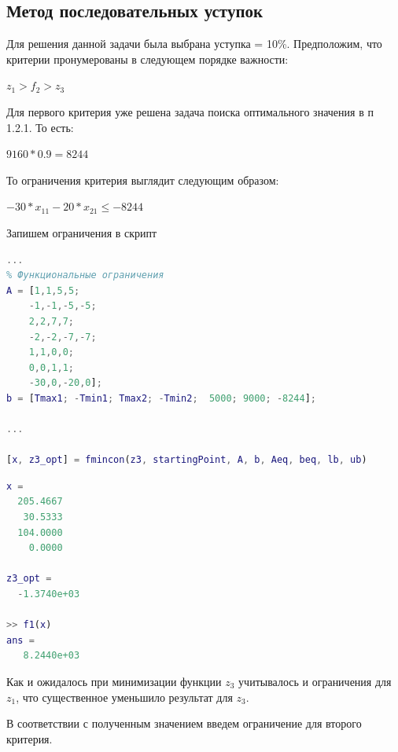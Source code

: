\subsection{Метод последовательных уступок}
Для решения данной задачи была выбрана уступка = 10\%. 	Предположим, что критерии пронумерованы в следующем порядке важности:
\begin{center}
$z_1>f_2>z_3$
\end{center} 
Для первого критерия уже решена задача поиска оптимального значения в п 1.2.1. То есть:
\begin{center}
$9160 * 0.9 = 8 244$
\end{center}
То ограничения критерия выглядит следующим образом:
\begin{center}
$-30*x_{11}-20*x_{21}\leq -8244$
\end{center}


Запишем ограничения в скрипт
\begin{lstlisting}[language={matlab}, caption={Последовательные уступки}]
...
% Функциональные ограничения
A = [1,1,5,5;
    -1,-1,-5,-5;
    2,2,7,7;
    -2,-2,-7,-7;
    1,1,0,0;
    0,0,1,1;
    -30,0,-20,0];
b = [Tmax1; -Tmin1; Tmax2; -Tmin2;  5000; 9000; -8244];

...

[x, z3_opt] = fmincon(z3, startingPoint, A, b, Aeq, beq, lb, ub)
\end{lstlisting}
\begin{lstlisting}[language={matlab}, caption={Результат выполнения}]
x =
  205.4667
   30.5333
  104.0000
    0.0000

z3_opt =
  -1.3740e+03
  
>> f1(x)
ans =
   8.2440e+03
\end{lstlisting}
Как и ожидалось при минимизации функции $z_3$ учитывалось и ограничения для $z_1$, что существенное уменьшило результат для $z_3$.

В соответствии с полученным значением введем ограничение для второго критерия.

